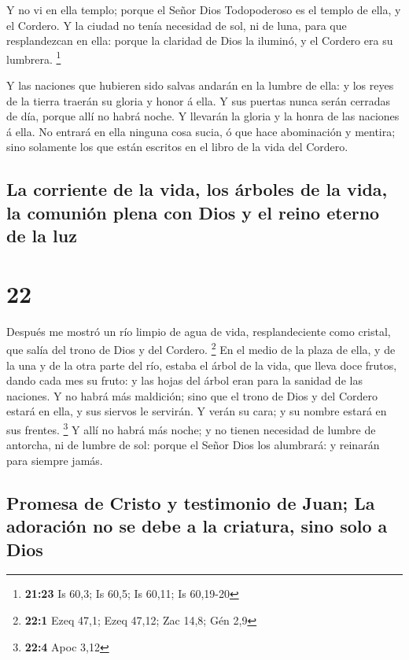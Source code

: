  Y no vi en ella templo; porque el Señor Dios Todopoderoso
es el templo de ella, y el Cordero.  Y la ciudad no tenía
necesidad de sol, ni de luna, para que resplandezcan en ella: porque la
claridad de Dios la iluminó, y el Cordero era su lumbrera. \footnote{\textbf{21:23}
  Is 60,3; Is 60,5; Is 60,11; Is 60,19-20}

 Y las naciones que hubieren sido salvas andarán en la
lumbre de ella: y los reyes de la tierra traerán su gloria y honor á
ella.  Y sus puertas nunca serán cerradas de día, porque
allí no habrá noche.  Y llevarán la gloria y la honra de
las naciones á ella.  No entrará en ella ninguna cosa
sucia, ó que hace abominación y mentira; sino solamente los que están
escritos en el libro de la vida del Cordero.

\hypertarget{la-corriente-de-la-vida-los-uxe1rboles-de-la-vida-la-comuniuxf3n-plena-con-dios-y-el-reino-eterno-de-la-luz}{%
\subsection{La corriente de la vida, los árboles de la vida, la comunión
plena con Dios y el reino eterno de la
luz}\label{la-corriente-de-la-vida-los-uxe1rboles-de-la-vida-la-comuniuxf3n-plena-con-dios-y-el-reino-eterno-de-la-luz}}

\hypertarget{section-21}{%
\section{22}\label{section-21}}

 Después me mostró un río limpio de agua de vida,
resplandeciente como cristal, que salía del trono de Dios y del Cordero.
\footnote{\textbf{22:1} Ezeq 47,1; Ezeq 47,12; Zac 14,8; Gén 2,9}
 En el medio de la plaza de ella, y de la una y de la otra
parte del río, estaba el árbol de la vida, que lleva doce frutos, dando
cada mes su fruto: y las hojas del árbol eran para la sanidad de las
naciones.  Y no habrá más maldición; sino que el trono de
Dios y del Cordero estará en ella, y sus siervos le servirán.
 Y verán su cara; y su nombre estará en sus frentes.
\footnote{\textbf{22:4} Apoc 3,12}  Y allí no habrá más
noche; y no tienen necesidad de lumbre de antorcha, ni de lumbre de sol:
porque el Señor Dios los alumbrará: y reinarán para siempre jamás.

\hypertarget{promesa-de-cristo-y-testimonio-de-juan-la-adoraciuxf3n-no-se-debe-a-la-criatura-sino-solo-a-dios}{%
\subsection{Promesa de Cristo y testimonio de Juan; La adoración no se
debe a la criatura, sino solo a
Dios}\label{promesa-de-cristo-y-testimonio-de-juan-la-adoraciuxf3n-no-se-debe-a-la-criatura-sino-solo-a-dios}}

